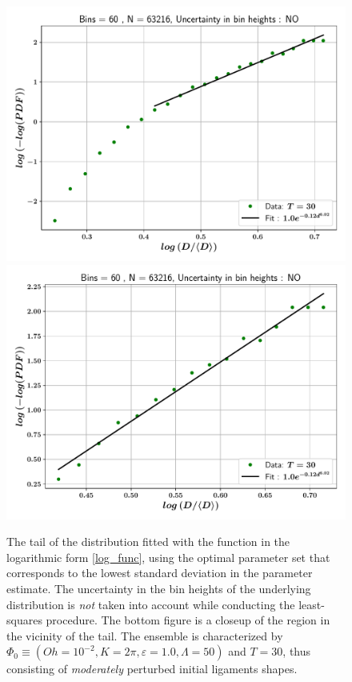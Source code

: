 
\begin{figure}
\centering
\includegraphics{plots/drop_stats/log_tail_fit_uncertainty_no.pdf} \\
\includegraphics{plots/drop_stats/log_zoom_tail_fit_uncertainty_no.pdf} \\ 
\caption{
	The tail of the distribution fitted with the function 
	in the logarithmic form \eqref{log_func}, using the optimal parameter
	set that corresponds to the lowest standard deviation in the parameter estimate.
	The uncertainty in the bin heights of the underlying distribution is \textit{not}
	taken into account while conducting the least-squares procedure. 
	The bottom figure is a closeup of the region in the vicinity of the tail.
	The ensemble is characterized by $\Phi_0 \equiv \left( Oh = 10^{-2}, K = 2\pi 
	, \varepsilon = 1.0 , \Lambda = 50 \right)$ and $T = 30$, 
	thus consisting of \textit{moderately} perturbed initial ligaments shapes. 
	}
\label{log_fits_wo}
\end{figure}


